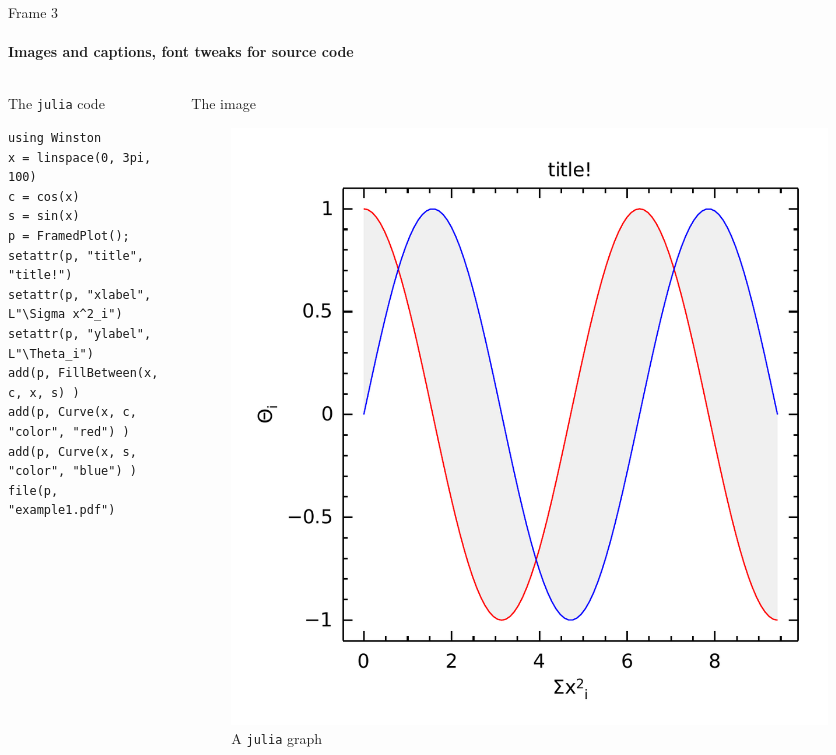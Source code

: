 \documentclass[presentation]{beamer}
\begin{document}
\begin{frame}[fragile,label=sec-1-3]{Frame 3}
 \framesubtitle{Images and captions, font tweaks for source code}

\begin{columns}
\begin{column}{0.6\textwidth}
\begin{block}{The \texttt{julia} code}

\footnotesize

\begin{verbatim}
using Winston
x = linspace(0, 3pi, 100)
c = cos(x)
s = sin(x)
p = FramedPlot();
setattr(p, "title", "title!")
setattr(p, "xlabel", L"\Sigma x^2_i")
setattr(p, "ylabel", L"\Theta_i")
add(p, FillBetween(x, c, x, s) )
add(p, Curve(x, c, "color", "red") )
add(p, Curve(x, s, "color", "blue") )
file(p, "example1.pdf")
\end{verbatim}

\normalsize
\end{block}
\end{column}
\begin{column}{0.4\textwidth}
\begin{block}{The image}

\begin{figure}[htb]
\centering
\includegraphics[width=.9\linewidth]{example1.pdf}
\caption{A \texttt{julia} graph}
\end{figure}
\end{block}
\end{column}
\end{columns}
\end{frame}
\end{document}
